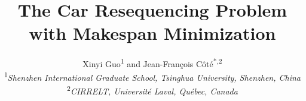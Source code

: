 \documentclass[12pt]{article}
\begin{document}




\title{The Car Resequencing Problem with Makespan Minimization}

\author{
Xinyi Guo\textsuperscript{1} and Jean-Fran\c{c}ois C\^{o}t\'e\textsuperscript{*,2}\\[12pt]
{\normalsize \textsuperscript{1}\textit{Shenzhen International Graduate School, Tsinghua University, Shenzhen, China}}\\
{\normalsize \textsuperscript{2}\textit{CIRRELT, Universit\'e Laval, Qu\'ebec, Canada}}
}

\date{}



\end{document}
